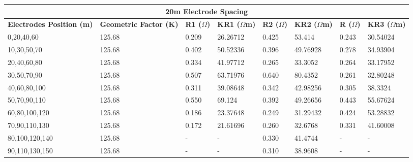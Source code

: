 \documentclass[12pt,a4paper]{report}
\begin{document}
\begin{itemize}
\begin{table}[H]
    \centering
    \begin{adjustbox}{max width=\textwidth}
    \setlength{\tabcolsep}{15pt}
    \renewcommand{\arraystretch}{1.5}
    \begin{tabular}{|p{3.5cm}|p{2.5cm}|p{1.8cm}|p{2.2cm}|p{1.8cm}|p{2.2cm}|p{1.8cm}|p{2.2cm}|}
    \hline
    \multicolumn{8}{|c|}{\rule{0pt}{3em}\huge\textbf{20m Electrode Spacing}} \\ [0.5cm]
    \hline
    \textbf{Electrodes Position (m)} & \textbf{Geometric Factor (K)} & \textbf{R1 ($\Omega$)} & \textbf{KR1 ($\Omega$m)} & \textbf{R2 ($\Omega$)} & \textbf{KR2 ($\Omega$m)} & \textbf{R ($\Omega$)} & \textbf{KR3 ($\Omega$m)} \\ \hline
    0,20,40,60 & 125.68 & 0.209 & 26.26712 & 0.425 & 53.414 & 0.243 & 30.54024 \\ \hline
    10,30,50,70 & 125.68 & 0.402 & 50.52336 & 0.396 & 49.76928 & 0.278 & 34.93904 \\ \hline
    20,40,60,80 & 125.68 & 0.334 & 41.97712 & 0.265 & 33.3052 & 0.264 & 33.17952 \\ \hline
    30,50,70,90 & 125.68 & 0.507 & 63.71976 & 0.640 & 80.4352 & 0.261 & 32.80248 \\ \hline
    40,60,80,100 & 125.68 & 0.311 & 39.08648 & 0.342 & 42.98256 & 0.305 & 38.3324 \\ \hline
    50,70,90,110 & 125.68 & 0.550 & 69.124 & 0.392 & 49.26656 & 0.443 & 55.67624 \\ \hline
    60,80,100,120 & 125.68 & 0.186 & 23.37648 & 0.249 & 31.29432 & 0.424 & 53.28832 \\ \hline
    70,90,110,130 & 125.68 & 0.172 & 21.61696 & 0.260 & 32.6768 & 0.331 & 41.60008 \\ \hline
    80,100,120,140 & 125.68 & - & - & 0.330 & 41.4744 & - & - \\ \hline
    90,110,130,150 & 125.68 & - & - & 0.310 & 38.9608 & - & - \\ \hline
    \end{tabular}
\end{adjustbox}
\end{table}


\end{itemize}
\end{document}
